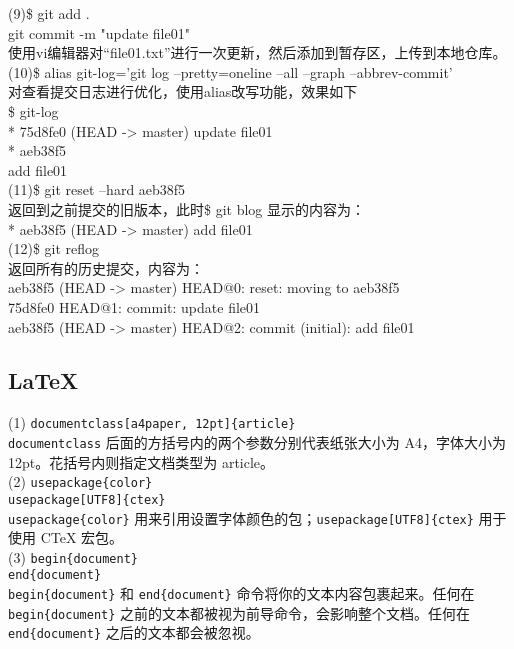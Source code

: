 \documentclass[a4paper, 12pt]{article}
\begin{document}
\noindent(9){\color{blue}\$ git add .}\\
git commit -m "update file01"\\
使用vi编辑器对“file01.txt”进行一次更新，然后添加到暂存区，上传到本地仓库。\\

\noindent(10){\color{blue}\$ alias git-log='git log --pretty=oneline --all --graph --abbrev-commit'}\\
对查看提交日志进行优化，使用alias改写功能，效果如下\\
\$ git-log\\
* 75d8fe0 (HEAD -> master) update file01\\
* aeb38f5 \\
add file01\\

\noindent(11){\color{blue}\$ git reset --hard aeb38f5}\\
返回到之前提交的旧版本，此时\$ git blog 显示的内容为：\\
* aeb38f5 (HEAD -> master) add file01\\

\noindent(12){\color{blue}\$ git reflog}\\
返回所有的历史提交，内容为：\\
aeb38f5 (HEAD -> master) HEAD@{0}: reset: moving to aeb38f5\\
75d8fe0 HEAD@{1}: commit: update file01\\
aeb38f5 (HEAD -> master) HEAD@{2}: commit (initial): add file01\\



\subsection{LaTeX}
\noindent(1) \texttt{documentclass[a4paper, 12pt]\{article\}} \\
\texttt{documentclass} 后面的方括号内的两个参数分别代表纸张大小为 A4，字体大小为 12pt。花括号内则指定文档类型为 article。\\

\noindent(2) \texttt{usepackage\{color\}} \\
\texttt{usepackage[UTF8]\{ctex\}} \\
\texttt{usepackage\{color\}} 用来引用设置字体颜色的包；\texttt{usepackage[UTF8]\{ctex\}} 用于使用 CTeX 宏包。\\

\noindent(3) \texttt{begin\{document\}} \\
\texttt{end\{document\}} \\
\texttt{begin\{document\}} 和 \texttt{end\{document\}} 命令将你的文本内容包裹起来。任何在 \texttt{begin\{document\}} 之前的文本都被视为前导命令，会影响整个文档。任何在 \texttt{end\{document\}} 之后的文本都会被忽视。\\
\end{document}
